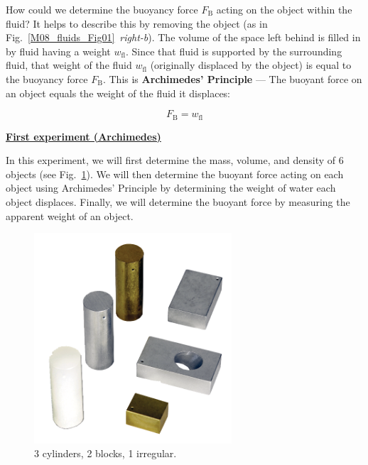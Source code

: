 How could we determine the buoyancy force $F_\text{B}$ acting on the object within the fluid? It helps to describe this by removing the object (as in Fig.~\ref{M08_fluids_Fig01}~\textit{right-b}). The volume of the space left behind is filled in by fluid having a weight $w_\text{fl}$. Since that fluid is supported by the surrounding fluid, that weight of the fluid $w_\text{fl}$ (originally displaced by the object) is equal to the buoyancy force $F_\text{B}$. This is \textbf{Archimedes' Principle} --- The buoyant force on an object equals the weight of the fluid it displaces:

\begin{equation}
\label{M08_fluids_Eq01}
    F_\text{B} = w_\text{fl}
\end{equation}


\underline{\textbf{First experiment (Archimedes)}}

In this experiment, we will first determine the mass, volume, and density of 6 objects (see Fig.~\ref{M08_fluids_Fig02}). We will then determine the buoyant force acting on each object using Archimedes' Principle by determining the weight of water each object displaces. Finally, we will determine the buoyant force by measuring the apparent weight of an object.

\begin{figure}[ht]
  \begin{center}
    \includegraphics[width=2.9in]{Fall/Experiment08Figures_Fluids/M08_fig02.png}
  \end{center}
  \caption{3 cylinders, 2 blocks, 1 irregular.}
  \label{M08_fluids_Fig02}
\end{figure}

